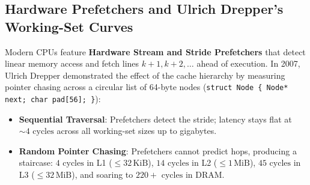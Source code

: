 \subsection{Hardware Prefetchers and Ulrich Drepper's Working-Set Curves}

Modern CPUs feature \textbf{Hardware Stream and Stride Prefetchers} that detect linear
memory access and fetch lines $k+1, k+2, \dots$ ahead of execution.
In 2007, Ulrich Drepper demonstrated the effect of the cache hierarchy by measuring pointer
chasing across a circular list of 64-byte nodes (\texttt{struct Node \{ Node* next; char pad[56]; \}}):
\begin{itemize}[itemsep=0pt]
    \item \textbf{Sequential Traversal}: Prefetchers detect the stride; latency stays flat at $\sim 4\text{ cycles}$ across all working-set sizes up to gigabytes.
    \item \textbf{Random Pointer Chasing}: Prefetchers cannot predict hops, producing a staircase:
    $4\text{ cycles}$ in L1 ($\le 32\,\text{KiB}$), $14\text{ cycles}$ in L2 ($\le 1\,\text{MiB}$),
    $45\text{ cycles}$ in L3 ($\le 32\,\text{MiB}$), and soaring to $220+\text{ cycles}$ in DRAM.
\end{itemize}

